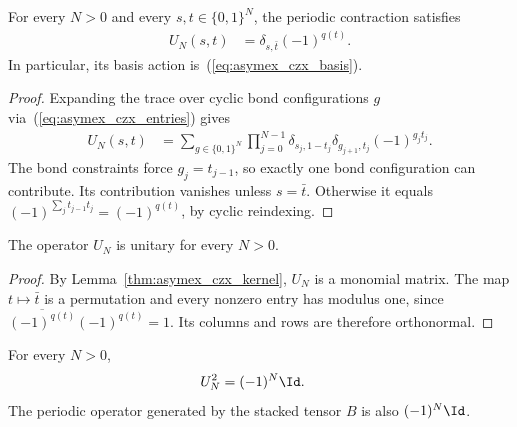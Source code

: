 \begin{lemma}
    \label{thm:asymex_czx_kernel}
    \leanok
    For every $N>0$ and every $s,t\in\{0,1\}^N$, the periodic
    contraction satisfies
    \begin{align}
        U_N(s,t) & =\delta_{s,\bar t}(-1)^{q(t)}.
        \label{eq:asymex_czx_kernel}
    \end{align}
    In particular, its basis action is~(\ref{eq:asymex_czx_basis}).
\end{lemma}

\begin{proof}
    \leanok
    Expanding the trace over cyclic bond configurations $g$
    via~(\ref{eq:asymex_czx_entries}) gives
    \begin{align}
        U_N(s,t)
         & =\sum_{g\in\{0,1\}^N}
        \prod_{j=0}^{N-1}
        \delta_{s_j,1-t_j}\delta_{g_{j+1},t_j}
        (-1)^{g_jt_j}.
        \label{eq:asymex_czx_contraction}
    \end{align}
    The bond constraints force $g_j=t_{j-1}$, so exactly one bond
    configuration can contribute. Its contribution vanishes unless
    $s=\bar t$. Otherwise it equals
    $(-1)^{\sum_jt_{j-1}t_j}=(-1)^{q(t)}$, by cyclic reindexing.
\end{proof}

\begin{lemma}
    \label{thm:asymex_czx_unitarity}
    \leanok
    The operator $U_N$ is unitary for every $N>0$.
\end{lemma}

\begin{proof}
    \leanok
    By Lemma~\ref{thm:asymex_czx_kernel}, $U_N$ is a monomial matrix.
    The map $t\mapsto\bar t$ is a permutation and every nonzero entry
    has modulus one, since
    $\overline{(-1)^{q(t)}}(-1)^{q(t)}=1$. Its columns and rows are
    therefore orthonormal.
\end{proof}

\begin{lemma}
    \label{thm:asymex_czx_square_operator}
    \leanok
    For every $N>0$,
    \begin{align}
        U_N^2 & =(-1)^N\Id.
        \label{eq:asymex_czx_square_operator}
    \end{align}
    The periodic operator generated by the stacked tensor $B$ is
    also $(-1)^N\Id$.
\end{lemma}

